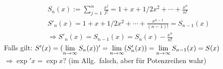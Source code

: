 \documentclass[../ana1.tex]{subfiles}
\begin{document}
\begin{bem}
	\begin{align*}
		S_n(x):= \sum_{j=1}^{n} \frac{x^j}{j!} = 1 + x + 1/2x^2 + \cdots + \frac{x^n}{n!}\\
		S'_n(x) = 1 + x + 1/2x^2 + \cdots + \frac{x^{n-1}}{(n-1)!} = S_{n-1}(x)\\
		\Rightarrow S'_n(x) = S_{n-1}(x) = S_n(x) - \frac{x^n}{n!}
	\end{align*}
	Falls gilt: \( S'(x) = ( \lim\limits_{n\rightarrow\infty}S_n(x) )' = \lim\limits_{n\rightarrow\infty}(S'_n(x)) = \lim\limits_{n\rightarrow\infty}S_{n-1}(x) = S(x) \)
	\( \Rightarrow \exp'x = \exp x? \) (im Allg.\ falsch, aber für Potenzreihen wahr)
\end{bem}
\end{document}
